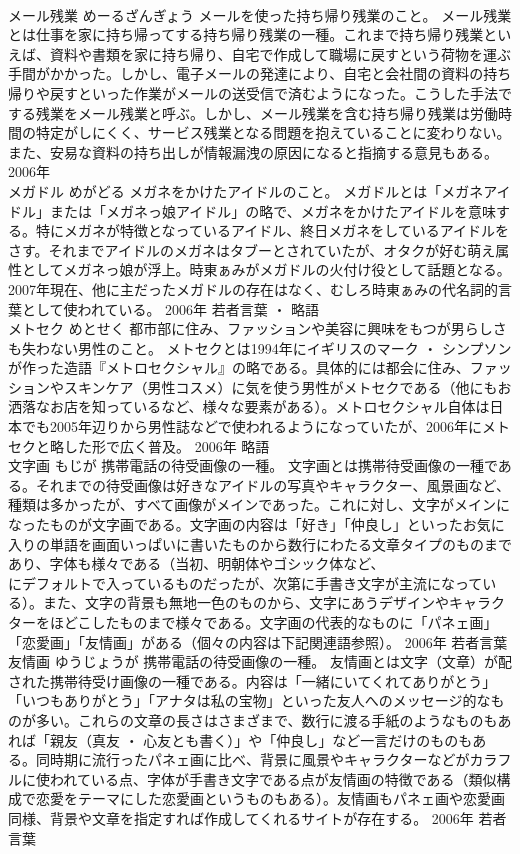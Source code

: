 \documentclass[8pt]{extreport}
\begin{document}
\begin{CJK}{UTF8}{min}
\\	メール残業	めーるざんぎょう	メールを使った持ち帰り残業のこと。	メール残業とは仕事を家に持ち帰ってする持ち帰り残業の一種。これまで持ち帰り残業といえば、資料や書類を家に持ち帰り、自宅で作成して職場に戻すという荷物を運ぶ手間がかかった。しかし、電子メールの発達により、自宅と会社間の資料の持ち帰りや戻すといった作業がメールの送受信で済むようになった。こうした手法でする残業をメール残業と呼ぶ。しかし、メール残業を含む持ち帰り残業は労働時間の特定がしにくく、サービス残業となる問題を抱えていることに変わりない。また、安易な資料の持ち出しが情報漏洩の原因になると指摘する意見もある。	2006年	
\\	メガドル	めがどる	メガネをかけたアイドルのこと。	メガドルとは「メガネアイドル」または「メガネっ娘アイドル」の略で、メガネをかけたアイドルを意味する。特にメガネが特徴となっているアイドル、終日メガネをしているアイドルをさす。それまでアイドルのメガネはタブーとされていたが、オタクが好む萌え属性としてメガネっ娘が浮上。時東ぁみがメガドルの火付け役として話題となる。2007年現在、他に主だったメガドルの存在はなく、むしろ時東ぁみの代名詞的言葉として使われている。	2006年	若者言葉 ・ 略語	
\\	メトセク	めとせく	都市部に住み、ファッションや美容に興味をもつが男らしさも失わない男性のこと。	メトセクとは1994年にイギリスのマーク ・ シンプソンが作った造語『メトロセクシャル』の略である。具体的には都会に住み、ファッションやスキンケア（男性コスメ）に気を使う男性がメトセクである（他にもお洒落なお店を知っているなど、様々な要素がある）。メトロセクシャル自体は日本でも2005年辺りから男性誌などで使われるようになっていたが、2006年にメトセクと略した形で広く普及。	2006年	略語	
\\	文字画	もじが	携帯電話の待受画像の一種。	文字画とは携帯待受画像の一種である。それまでの待受画像は好きなアイドルの写真やキャラクター、風景画など、種類は多かったが、すべて画像がメインであった。これに対し、文字がメインになったものが文字画である。文字画の内容は「好き」「仲良し」といったお気に入りの単語を画面いっぱいに書いたものから数行にわたる文章タイプのものまであり、字体も様々である（当初、明朝体やゴシック体など、
\\	にデフォルトで入っているものだったが、次第に手書き文字が主流になっている）。また、文字の背景も無地一色のものから、文字にあうデザインやキャラクターをほどこしたものまで様々である。文字画の代表的なものに「パネェ画」「恋愛画」「友情画」がある（個々の内容は下記関連語参照）。	2006年	若者言葉	
\\	友情画	ゆうじょうが	携帯電話の待受画像の一種。	友情画とは文字（文章）が配された携帯待受け画像の一種である。内容は「一緒にいてくれてありがとう」「いつもありがとう」「アナタは私の宝物」といった友人へのメッセージ的なものが多い。これらの文章の長さはさまざまで、数行に渡る手紙のようなものもあれば「親友（真友 ・ 心友とも書く）」や「仲良し」など一言だけのものもある。同時期に流行ったパネェ画に比べ、背景に風景やキャラクターなどがカラフルに使われている点、字体が手書き文字である点が友情画の特徴である（類似構成で恋愛をテーマにした恋愛画というものもある）。友情画もパネェ画や恋愛画同様、背景や文章を指定すれば作成してくれるサイトが存在する。	2006年	若者言葉	

\end{CJK}
\end{document}
